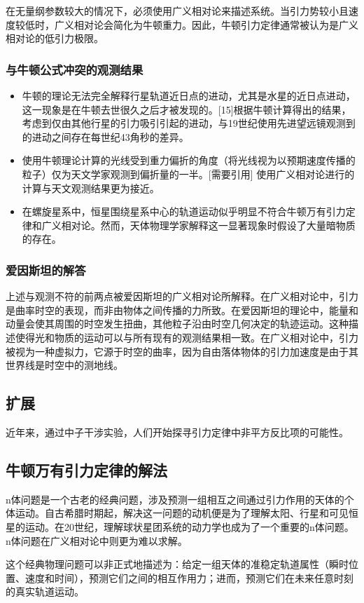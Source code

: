 在无量纲参数较大的情况下，必须使用广义相对论来描述系统。当引力势较小且速度较低时，广义相对论会简化为牛顿重力。因此，牛顿引力定律通常被认为是广义相对论的低引力极限。
\subsubsection{与牛顿公式冲突的观测结果}
\begin{itemize}
\item 牛顿的理论无法完全解释行星轨道近日点的进动，尤其是水星的近日点进动，这一现象是在牛顿去世很久之后才被发现的。[15]根据牛顿计算得出的结果，考虑到仅由其他行星的引力吸引引起的进动，与19世纪使用先进望远镜观测到的进动之间存在每世纪43角秒的差异。
\item 使用牛顿理论计算的光线受到重力偏折的角度（将光线视为以预期速度传播的粒子）仅为天文学家观测到偏折量的一半。[需要引用] 使用广义相对论进行的计算与天文观测结果更为接近。
\item 在螺旋星系中，恒星围绕星系中心的轨道运动似乎明显不符合牛顿万有引力定律和广义相对论。然而，天体物理学家解释这一显著现象时假设了大量暗物质的存在。
\end{itemize}
\subsubsection{爱因斯坦的解答}
上述与观测不符的前两点被爱因斯坦的广义相对论所解释。在广义相对论中，引力是曲率时空的表现，而非由物体之间传播的力所致。在爱因斯坦的理论中，能量和动量会使其周围的时空发生扭曲，其他粒子沿由时空几何决定的轨迹运动。这种描述使得光和物质的运动可以与所有现有的观测结果相一致。在广义相对论中，引力被视为一种虚拟力，它源于时空的曲率，因为自由落体物体的引力加速度是由于其世界线是时空中的测地线。
\subsection{扩展}  
近年来，通过中子干涉实验，人们开始探寻引力定律中非平方反比项的可能性。
\subsection{牛顿万有引力定律的解法} 
n体问题是一个古老的经典问题，涉及预测一组相互之间通过引力作用的天体的个体运动。自古希腊时期起，解决这一问题的动机便是为了理解太阳、行星和可见恒星的运动。在20世纪，理解球状星团系统的动力学也成为了一个重要的n体问题。n体问题在广义相对论中则更为难以求解。  

这个经典物理问题可以非正式地描述为：给定一组天体的准稳定轨道属性（瞬时位置、速度和时间），预测它们之间的相互作用力；进而，预测它们在未来任意时刻的真实轨道运动。  

